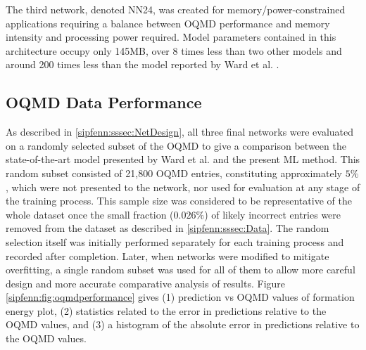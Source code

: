 The third network, denoted NN24, was created for memory/power-constrained applications requiring a balance between OQMD performance and memory intensity and processing power required. Model parameters contained in this architecture occupy only 145MB, over 8 times less than two other models and around 200 times less than the model reported by Ward et al. \cite{Ward2017IncludingTessellations}.

\subsection{OQMD Data Performance} \label{sipfenn:ssec:oqmdperformance}
As described in \ref{sipfenn:sssec:NetDesign}, all three final networks were evaluated on a randomly selected subset of the OQMD to give a comparison between the state-of-the-art model presented by Ward et al. \cite{Ward2017IncludingTessellations} and the present ML method. This random subset consisted of 21,800 OQMD entries, constituting approximately $5\%$, which were not presented to the network, nor used for evaluation at any stage of the training process. This sample size was considered to be representative of the whole dataset once the small fraction ($0.026\%$) of likely incorrect entries were removed from the dataset as described in \ref{sipfenn:sssec:Data}. The random selection itself was initially performed separately for each training process and recorded after completion. Later, when networks were modified to mitigate overfitting, a single random subset was used for all of them to allow more careful design and more accurate comparative analysis of results. Figure \ref{sipfenn:fig:oqmdperformance} gives (1) prediction vs OQMD values of formation energy plot, (2) statistics related to the error in predictions relative to the OQMD values, and (3) a histogram of the absolute error in predictions relative to the OQMD values.

